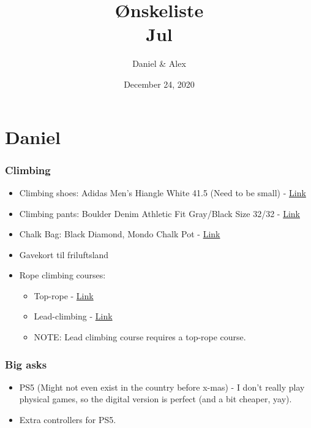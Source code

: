\documentclass[a4paper,12pt]{article}
\begin{document}
\title{Ønskeliste\\Jul}
\author{Daniel \& Alex}
\date{December 24, 2020}
\maketitle
\section*{Daniel}
\subsubsection*{Climbing}
\begin{itemize} 
	\item Climbing shoes: Adidas Men's Hiangle White 41.5 (Need to be small) - \href{https://www.outnorth.dk/adidas/men-s-hiangle-climbing-shoes?gclid=CjwKCAiA2O39BRBjEiwApB2Iklft7B-QXR6khNFbsWowmiptlq6mhYEJJPBsYVXhPE6ctu_fbgWgAxoCd94QAvD_BwE#WhiteCoreblack}{Link}
	\item Climbing pants: Boulder Denim Athletic Fit Gray/Black Size 32/32 - \href{https://boulderdenim.com/collections/featured-products/products/boulder-denim-2-0-men-s-athletic-fit-slate-grey?variant=28389395955806}{Link}
	\item Chalk Bag: Black Diamond, Mondo Chalk Pot - \href{https://www.bergfreunde.dk/black-diamond-mondo-chalk-pot-chalkbag/?aid=59e75e30f032620a694e22ee98ad1e8a&pid=10004&gclid=CjwKCAiA2O39BRBjEiwApB2IkrPvZMmtbBnGrKyRhCFVM8gHkxrMJ28c4Uc-aUdp3N1s7_yPZlRxXRoC2kEQAvD_BwE&wt_mc=dk.pla.google_dk.230712174.17213221494.57638913894}{Link}
	\item Gavekort til friluftsland
	\item Rope climbing courses:
	\begin{itemize}
		\item Top-rope - \href{https://www.blocs-walls.dk/k1-toprebskursus/}{Link}
		\item Lead-climbing - \href{https://www.blocs-walls.dk/k2-foringskursus/}{Link}
		\item NOTE: Lead climbing course requires a top-rope course. 
	\end{itemize}
\end{itemize} 
\subsubsection*{Big asks}
\begin{itemize} 
	\item PS5 (Might not even exist in the country before x-mas) - I don't really play physical games, so the digital version is perfect (and a bit cheaper, yay). 
	\item Extra controllers for PS5. 
\end{itemize} 
\end{document}
